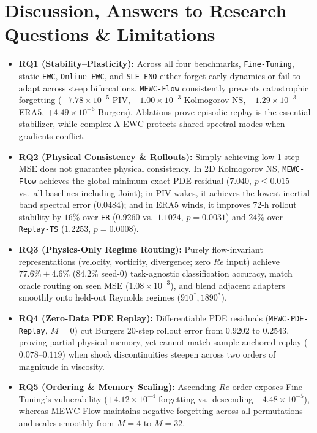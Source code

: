 \documentclass[11pt,a4paper]{article}
\begin{document}
\section{Discussion, Answers to Research Questions \& Limitations}

\begin{itemize}
  \item \textbf{RQ1 (Stability--Plasticity):} Across all four benchmarks, \texttt{Fine-Tuning}, static \texttt{EWC}, \texttt{Online-EWC}, and \texttt{SLE-FNO} either forget early dynamics or fail to adapt across steep bifurcations. \texttt{MEWC-Flow} consistently prevents catastrophic forgetting ($-7.78 \times 10^{-5}$ PIV, $-1.00 \times 10^{-3}$ Kolmogorov NS, $-1.29 \times 10^{-3}$ ERA5, $+4.49 \times 10^{-6}$ Burgers). Ablations prove episodic replay is the essential stabilizer, while complex A-EWC protects shared spectral modes when gradients conflict.
  \item \textbf{RQ2 (Physical Consistency \& Rollouts):} Simply achieving low 1-step MSE does not guarantee physical consistency. In 2D Kolmogorov NS, \texttt{MEWC-Flow} achieves the global minimum exact PDE residual ($7.040$, $p \le 0.015$ vs.\ all baselines including Joint); in PIV wakes, it achieves the lowest inertial-band spectral error ($0.0484$); and in ERA5 winds, it improves 72-h rollout stability by $16\%$ over \texttt{ER} ($0.9260$ vs.\ $1.1024$, $p = 0.0031$) and $24\%$ over \texttt{Replay-TS} ($1.2253$, $p = 0.0008$).
  \item \textbf{RQ3 (Physics-Only Regime Routing):} Purely flow-invariant representations (velocity, vorticity, divergence; zero $Re$ input) achieve $77.6\% \pm 4.6\%$ ($84.2\%$ seed-0) task-agnostic classification accuracy, match oracle routing on seen MSE ($1.08 \times 10^{-3}$), and blend adjacent adapters smoothly onto held-out Reynolds regimes ($910^*, 1890^*$).
  \item \textbf{RQ4 (Zero-Data PDE Replay):} Differentiable PDE residuals (\texttt{MEWC-PDE-Replay}, $M=0$) cut Burgers 20-step rollout error from $0.9202$ to $0.2543$, proving partial physical memory, yet cannot match sample-anchored replay ($0.078$--$0.119$) when shock discontinuities steepen across two orders of magnitude in viscosity.
  \item \textbf{RQ5 (Ordering \& Memory Scaling):} Ascending $Re$ order exposes Fine-Tuning's vulnerability ($+4.12 \times 10^{-4}$ forgetting vs.\ descending $-4.48 \times 10^{-5}$), whereas MEWC-Flow maintains negative forgetting across all permutations and scales smoothly from $M=4$ to $M=32$.
\end{itemize}
\end{document}
